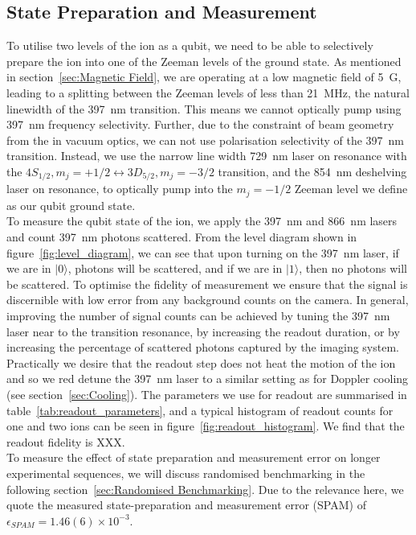\documentclass[12pt]{report}
\begin{document}
\subsection{State Preparation and Measurement}
    To utilise two levels of the ion as a qubit, we need to be able to
    selectively prepare the ion into one of the Zeeman levels of the ground
    state. As mentioned in section~\ref{sec:Magnetic Field}, we are operating at
    a low magnetic field of 5~G, leading to a splitting between the Zeeman
    levels of less than 21~MHz, the natural linewidth of the 397~nm transition.
    This means we cannot optically pump using 397~nm frequency selectivity.
    Further, due to the constraint of beam geometry from the in vacuum optics,
    we can not use polarisation selectivity of the 397~nm transition. Instead,
    we use the narrow line width 729~nm laser on resonance with the $4S_{1/2},
    m_j = +1/2 \leftrightarrow 3D_{5/2}, m_j = -3/2$ transition, and the 854~nm
    deshelving laser on resonance, to optically pump into the $m_j = -1/2$
    Zeeman level we define as our qubit ground state. \\
    To measure the qubit state of the ion, we apply the 397~nm and 866~nm lasers
    and count 397~nm photons scattered. From the level diagram shown in
    figure~\ref{fig:level_diagram}, we can see that upon turning on the 397~nm
    laser, if we are in $|0\rangle$, photons will be scattered, and if we are in
    $|1\rangle$, then no photons will be scattered. To optimise the fidelity of
    measurement we ensure that the signal is discernible with low error from any
    background counts on the camera. In general, improving the number of signal
    counts can be achieved by tuning the 397~nm laser near to the transition
    resonance, by increasing the readout duration, or by increasing the
    percentage of scattered photons captured by the imaging system. Practically
    we desire that the readout step does not heat the motion of the ion and so
    we red detune the 397~nm laser to a similar setting as for Doppler cooling
    (see section~\ref{sec:Cooling}). The parameters we use for readout are
    summarised in table~\ref{tab:readout_parameters}, and a typical histogram of
    readout counts for one and two ions can be seen in
    figure~\ref{fig:readout_histogram}. We find that the readout fidelity is
    XXX.\\
    To measure the effect of state preparation and measurement error on longer
    experimental sequences, we will discuss randomised benchmarking in the following
    section~\ref{sec:Randomised Benchmarking}. Due to the relevance here, we
    quote the measured state-preparation and measurement error (SPAM) of $\epsilon_{SPAM} = 1.46(6) \times 10^{-3}$.\\
    
\end{document}
